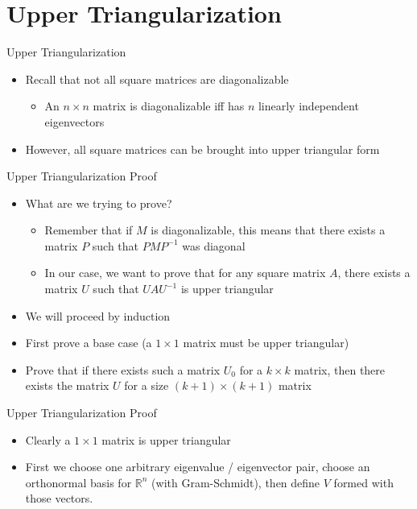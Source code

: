 \section{Upper Triangularization}


\begin{frame}{Upper Triangularization}

    \begin{itemize}
        \item
Recall that not all square matrices are diagonalizable
            \begin{itemize}
        \item
           An \(n \times n\) matrix is diagonalizable iff has \(n\) linearly independent eigenvectors
            \end{itemize}
        \item
However, all square matrices can be brought into upper triangular form
    \end{itemize}
\end{frame}

\begin{frame}{Upper Triangularization Proof}
    \begin{itemize}
        \item What are we trying to prove?
            \begin{itemize}
                \item
                    Remember that if \(M\) is diagonalizable, this means that there exists a matrix \(P\) such that \(PMP^{-1}\) was diagonal
                \item In our case, we want to prove that for any square matrix \(A\), there exists a matrix \(U\) such that \(UAU^{-1}\) is upper triangular
            \end{itemize}
        \item We will proceed by induction
        \item First prove a base case (a \(1 \times 1\) matrix must be upper triangular)
        \item  Prove that if there exists such a matrix \(U_0\) for a \(k \times k\) matrix, then there exists the matrix \(U\) for a size \((k+1) \times (k+1)\) matrix
    \end{itemize}
\end{frame}

\begin{frame}{Upper Triangularization Proof}

%
    \begin{itemize}
        \item Clearly a \(1 \times 1\) matrix is upper triangular
        \item
            First we choose one arbitrary eigenvalue / eigenvector pair, choose an orthonormal basis for \(\mathbb R^n\) (with Gram-Schmidt), then define \(V\) formed with those vectors.
    \end{itemize}

\end{frame}

